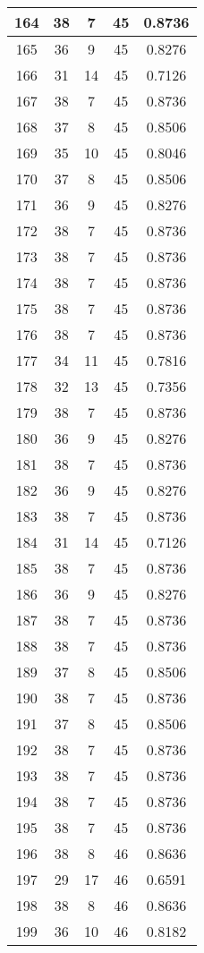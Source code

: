 \documentclass[letterpaper, 12pt]{article}
\begin{document}
\begin{longtable}{|c|c|c|c|c|}
\hline
164 & 38 & 7 & 45 & 0.8736 \\
\hline
165 & 36 & 9 & 45 & 0.8276 \\
\hline
166 & 31 & 14 & 45 & 0.7126 \\
\hline
167 & 38 & 7 & 45 & 0.8736 \\
\hline
168 & 37 & 8 & 45 & 0.8506 \\
\hline
169 & 35 & 10 & 45 & 0.8046 \\
\hline
170 & 37 & 8 & 45 & 0.8506 \\
\hline
171 & 36 & 9 & 45 & 0.8276 \\
\hline
172 & 38 & 7 & 45 & 0.8736 \\
\hline
173 & 38 & 7 & 45 & 0.8736 \\
\hline
174 & 38 & 7 & 45 & 0.8736 \\
\hline
175 & 38 & 7 & 45 & 0.8736 \\
\hline
176 & 38 & 7 & 45 & 0.8736 \\
\hline
177 & 34 & 11 & 45 & 0.7816 \\
\hline
178 & 32 & 13 & 45 & 0.7356 \\
\hline
179 & 38 & 7 & 45 & 0.8736 \\
\hline
180 & 36 & 9 & 45 & 0.8276 \\
\hline
181 & 38 & 7 & 45 & 0.8736 \\
\hline
182 & 36 & 9 & 45 & 0.8276 \\
\hline
183 & 38 & 7 & 45 & 0.8736 \\
\hline
184 & 31 & 14 & 45 & 0.7126 \\
\hline
185 & 38 & 7 & 45 & 0.8736 \\
\hline
186 & 36 & 9 & 45 & 0.8276 \\
\hline
187 & 38 & 7 & 45 & 0.8736 \\
\hline
188 & 38 & 7 & 45 & 0.8736 \\
\hline
189 & 37 & 8 & 45 & 0.8506 \\
\hline
190 & 38 & 7 & 45 & 0.8736 \\
\hline
191 & 37 & 8 & 45 & 0.8506 \\
\hline
192 & 38 & 7 & 45 & 0.8736 \\
\hline
193 & 38 & 7 & 45 & 0.8736 \\
\hline
194 & 38 & 7 & 45 & 0.8736 \\
\hline
195 & 38 & 7 & 45 & 0.8736 \\
\hline
196 & 38 & 8 & 46 & 0.8636 \\
\hline
197 & 29 & 17 & 46 & 0.6591 \\
\hline
198 & 38 & 8 & 46 & 0.8636 \\
\hline
199 & 36 & 10 & 46 & 0.8182 \\
\hline
\end{longtable}
\end{document}
